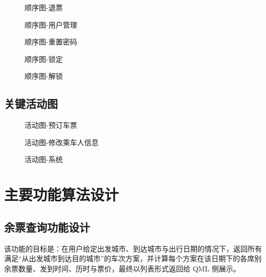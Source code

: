 \documentclass{article}
\begin{document}
	\begin{figure}[H]
		\centering
		
		\caption{顺序图-退票}
		\label{顺序图-退票}
	\end{figure}
	\begin{figure}[H]
		\centering
		
		\caption{顺序图-用户管理}
		\label{顺序图-用户管理}
	\end{figure}
	\begin{figure}[H]
		\centering
		
		\caption{顺序图-重置密码}
		\label{顺序图-重置密码}
	\end{figure}
	\begin{figure}[H]
		\centering
		
		\caption{顺序图-锁定}
		\label{顺序图-锁定}
	\end{figure}
	\begin{figure}[H]
		\centering
		
		\caption{顺序图-解锁}
		\label{顺序图-解锁}
	\end{figure}
	
	
	\subsection{关键活动图}
	\begin{figure}[H]
		\centering
		
		\caption{活动图-预订车票}
		\label{活动图-预订车票}
	\end{figure}
	\begin{figure}[H]
		\centering
		
		\caption{活动图-修改乘车人信息}
		\label{活动图-修改乘车人信息}
	\end{figure}
	\begin{figure}[H]
		\centering
		
		\caption{活动图-系统}
		\label{活动图-系统}
	\end{figure}
	
	\section{主要功能算法设计}
	\subsection{余票查询功能设计}
	该功能的目标是：在用户给定出发城市、到达城市与出行日期的情况下，返回所有满足“从出发城市到达目的城市”的车次方案，并计算每个方案在该日期下的各席别余票数量、发到时间、历时与票价，最终以列表形式返回给 QML 侧展示。
	
\end{document}
